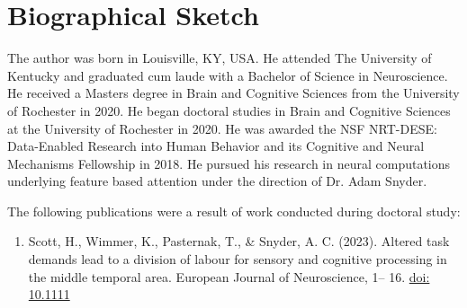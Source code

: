 



\chapter*{Biographical Sketch}

The author was born in Louisville, KY, USA. He attended The University of Kentucky and graduated cum laude with a Bachelor of Science in Neuroscience. He received a Masters degree in Brain and Cognitive Sciences from the University of Rochester in 2020. He began doctoral studies in Brain and Cognitive Sciences at the University of Rochester in 2020. He was awarded the NSF NRT-DESE: Data-Enabled Research into Human Behavior and its Cognitive and Neural
Mechanisms Fellowship in 2018. He pursued his research in neural computations underlying feature based attention under the direction of Dr. Adam Snyder.

The following publications were a result of work conducted during doctoral study:

\begin{enumerate}
	\item Scott, H., Wimmer, K., Pasternak, T., \& Snyder, A. C. (2023). Altered task demands lead to a division of labour for sensory and cognitive processing in the middle temporal area. European Journal of Neuroscience, 1– 16. \href{https://doi.org/10.1111/ejn.15964}{doi: 10.1111}
\end{enumerate}



